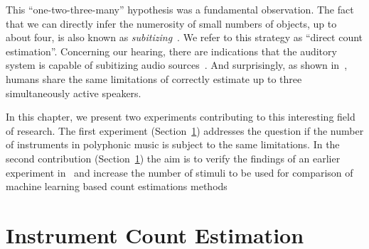 This ``one-two-three-many'' hypothesis was a fundamental observation.
The fact that we can directly infer the numerosity of small numbers of objects, up to about four, is also known as \emph{subitizing}~\cite{kaufman49, burr10}. We refer to this strategy as ``direct count estimation''.
Concerning our hearing, there are indications that the auditory system is capable of subitizing audio sources~\cite{hoopen79}.
And surprisingly, as shown in~\cite{kashino96, kawashima15}, humans share the same limitations of correctly estimate up to three simultaneously active speakers.
\par
In this chapter, we present two experiments contributing to this interesting field of research.
The first experiment (Section~\ref{sec:ismir}) addresses the question if the number of instruments in polyphonic music is subject to the same limitations.
In the second contribution (Section~\ref{sec:ismir}) the aim is to verify the findings of an earlier experiment in~\cite{kawashima15} and increase the number of stimuli to be used for comparison of machine learning based count estimations methods

\section{Instrument Count Estimation}%
\label{sec:ismir}


